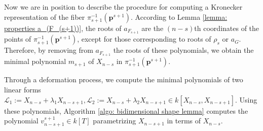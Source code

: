 \documentclass[pdflatex,sn-basic]{sn-jnl}%
\theoremstyle{thmstyleone}%
\theoremstyle{thmstyletwo}%
\theoremstyle{thmstylethree}%
\theoremstyle{definition}
\numberwithin{equation}{section}
\newcommand{\bfs}{\boldsymbol}
\begin{document}
Now we are in position to describe the procedure for computing a
Kronecker representation of the fiber $\pi_{s+1}^{-1}(\bfs p^{s+1})$.
According to Lemma \ref{lemma: properties a_(F_(s+1))}, the roots of
$a_{F_{s+1}}$ are the $(n-s)$th coordinates of the points of
$\pi_{s+1}^{-1}(\bfs p^{s+1})$, except for those corresponding to roots
of $\rho_s$ or $a_G$. Therefore, by removing from $a_{F_{s+1}}$ the
roots of these polynomials, we obtain the minimal polynomial
$m_{s+1}$ of $X_{n-s}$ in $\pi_{s+1}^{-1}(\bfs p^{s+1})$.

Through a deformation process, we compute the minimal polynomials of
two linear forms $\mathcal{L}_1:=X_{n-s}+\lambda_1X_{n-s+1},
\mathcal{L}_2:=X_{n-s}+\lambda_2X_{n-s+1}\in k[X_{n-s},X_{n-s+1}]$.
Using these polynomials, Algorithm \ref{algo: bidimensional shape
lemma} computes the polynomial $v_{n-s+1}^{s+1}\in k[T]$
parametrizing $X_{n-s+1}$ in terms of $X_{n-s}$.
\end{document}
